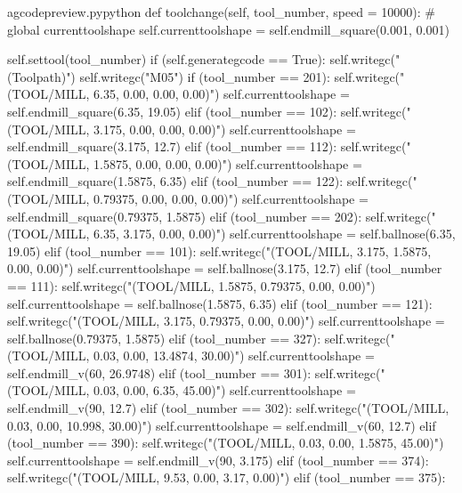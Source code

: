 \documentclass{ltxdoc}
\begin{document}
\lstset{firstnumber=\thegcpy}
\begin{writecode}{a}{gcodepreview.py}{python}
    def toolchange(self, tool_number, speed = 10000):
#        global currenttoolshape
        self.currenttoolshape = self.endmill_square(0.001, 0.001)    
            
        self.settool(tool_number)
        if (self.generategcode == True):
            self.writegc("(Toolpath)")
            self.writegc("M05")
        if (tool_number == 201):
            self.writegc("(TOOL/MILL, 6.35, 0.00, 0.00, 0.00)")
            self.currenttoolshape = self.endmill_square(6.35, 19.05)
        elif (tool_number == 102):
            self.writegc("(TOOL/MILL, 3.175, 0.00, 0.00, 0.00)")
            self.currenttoolshape = self.endmill_square(3.175, 12.7)
        elif (tool_number == 112):
            self.writegc("(TOOL/MILL, 1.5875, 0.00, 0.00, 0.00)")
            self.currenttoolshape = self.endmill_square(1.5875, 6.35)
        elif (tool_number == 122):
            self.writegc("(TOOL/MILL, 0.79375, 0.00, 0.00, 0.00)")
            self.currenttoolshape = self.endmill_square(0.79375, 1.5875)
        elif (tool_number == 202):
            self.writegc("(TOOL/MILL, 6.35, 3.175, 0.00, 0.00)")
            self.currenttoolshape = self.ballnose(6.35, 19.05)
        elif (tool_number == 101):
            self.writegc("(TOOL/MILL, 3.175, 1.5875, 0.00, 0.00)")
            self.currenttoolshape = self.ballnose(3.175, 12.7)
        elif (tool_number == 111):
            self.writegc("(TOOL/MILL, 1.5875, 0.79375, 0.00, 0.00)")
            self.currenttoolshape = self.ballnose(1.5875, 6.35)
        elif (tool_number == 121):
            self.writegc("(TOOL/MILL, 3.175, 0.79375, 0.00, 0.00)")
            self.currenttoolshape = self.ballnose(0.79375, 1.5875)
        elif (tool_number == 327):
            self.writegc("(TOOL/MILL, 0.03, 0.00, 13.4874, 30.00)")
            self.currenttoolshape = self.endmill_v(60, 26.9748)
        elif (tool_number == 301):
            self.writegc("(TOOL/MILL, 0.03, 0.00, 6.35, 45.00)")
            self.currenttoolshape = self.endmill_v(90, 12.7)
        elif (tool_number == 302):
            self.writegc("(TOOL/MILL, 0.03, 0.00, 10.998, 30.00)")
            self.currenttoolshape = self.endmill_v(60, 12.7)
        elif (tool_number == 390):
            self.writegc("(TOOL/MILL, 0.03, 0.00, 1.5875, 45.00)")
            self.currenttoolshape = self.endmill_v(90, 3.175)
        elif (tool_number == 374):
            self.writegc("(TOOL/MILL, 9.53, 0.00, 3.17, 0.00)")
        elif (tool_number == 375):

\end{writecode}
\end{document}

